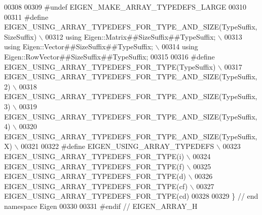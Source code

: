 \begin{DoxyCode}
00308 
00309 \textcolor{preprocessor}{#undef EIGEN\_MAKE\_ARRAY\_TYPEDEFS\_LARGE}
00310 
00311 \textcolor{preprocessor}{#define EIGEN\_USING\_ARRAY\_TYPEDEFS\_FOR\_TYPE\_AND\_SIZE(TypeSuffix, SizeSuffix) \(\backslash\)}
00312 \textcolor{preprocessor}{using Eigen::Matrix##SizeSuffix##TypeSuffix; \(\backslash\)}
00313 \textcolor{preprocessor}{using Eigen::Vector##SizeSuffix##TypeSuffix; \(\backslash\)}
00314 \textcolor{preprocessor}{using Eigen::RowVector##SizeSuffix##TypeSuffix;}
00315 
00316 \textcolor{preprocessor}{#define EIGEN\_USING\_ARRAY\_TYPEDEFS\_FOR\_TYPE(TypeSuffix) \(\backslash\)}
00317 \textcolor{preprocessor}{EIGEN\_USING\_ARRAY\_TYPEDEFS\_FOR\_TYPE\_AND\_SIZE(TypeSuffix, 2) \(\backslash\)}
00318 \textcolor{preprocessor}{EIGEN\_USING\_ARRAY\_TYPEDEFS\_FOR\_TYPE\_AND\_SIZE(TypeSuffix, 3) \(\backslash\)}
00319 \textcolor{preprocessor}{EIGEN\_USING\_ARRAY\_TYPEDEFS\_FOR\_TYPE\_AND\_SIZE(TypeSuffix, 4) \(\backslash\)}
00320 \textcolor{preprocessor}{EIGEN\_USING\_ARRAY\_TYPEDEFS\_FOR\_TYPE\_AND\_SIZE(TypeSuffix, X) \(\backslash\)}
00321 \textcolor{preprocessor}{}
00322 \textcolor{preprocessor}{#define EIGEN\_USING\_ARRAY\_TYPEDEFS \(\backslash\)}
00323 \textcolor{preprocessor}{EIGEN\_USING\_ARRAY\_TYPEDEFS\_FOR\_TYPE(i) \(\backslash\)}
00324 \textcolor{preprocessor}{EIGEN\_USING\_ARRAY\_TYPEDEFS\_FOR\_TYPE(f) \(\backslash\)}
00325 \textcolor{preprocessor}{EIGEN\_USING\_ARRAY\_TYPEDEFS\_FOR\_TYPE(d) \(\backslash\)}
00326 \textcolor{preprocessor}{EIGEN\_USING\_ARRAY\_TYPEDEFS\_FOR\_TYPE(cf) \(\backslash\)}
00327 \textcolor{preprocessor}{EIGEN\_USING\_ARRAY\_TYPEDEFS\_FOR\_TYPE(cd)}
00328 
00329 \} \textcolor{comment}{// end namespace Eigen}
00330 
00331 \textcolor{preprocessor}{#endif // EIGEN\_ARRAY\_H}
\end{DoxyCode}
